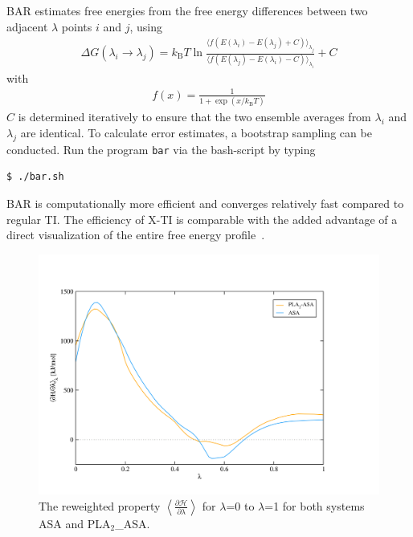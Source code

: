 BAR estimates free energies from the free energy differences between two adjacent $\lambda$ points $i$ and $j$, using
\begin{align}
\Delta G(\lambda_i \rightarrow \lambda_j) 
     = k_{\text{B}} T \ln \frac{\langle f(E(\lambda_i) - E(\lambda_j) + C)\rangle_{\lambda_j}}
          {\langle f(E(\lambda_j)-E(\lambda_i) - C )\rangle_{\lambda_i}}  + C
\end{align}
with
\begin{align}
f(x) = \frac{1}{1+\exp(x/k_{\text{B}} T)}
\end{align}
$C$ is determined iteratively to ensure that the two ensemble averages
from $\lambda_i$ and $\lambda_j$ are identical. To calculate error estimates, a
bootstrap sampling can be conducted. Run the program \texttt{bar} via
the bash-script by typing
\begin{lstlisting}
$ ./bar.sh 
\end{lstlisting}
%
BAR is computationally more efficient and converges relatively fast compared to regular TI. The efficiency of X-TI is comparable with the added advantage of a direct visualization of the entire free energy profile~\cite{Maurer}.

\begin{figure}[H]
    \centering
    \includegraphics[scale=0.3]{../05_tutorial_02/figures/ana_TI.png}
    \caption{The reweighted property $\left<\frac{\partial\mathcal{H}}{\partial\lambda}\right>$ for $\lambda$=0 to $\lambda$=1 for both systems ASA and PLA$_2$\_ASA.}
    \label{TI_ASA}
\end{figure}

